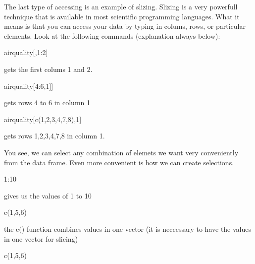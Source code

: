\documentclass[a4paper,twoside]{tufte-book}\usepackage[]{graphicx}\usepackage[]{color}
\begin{document}
\begin{Anhang}
The last type of accessing is an example of slizing. Slizing is a very powerfull technique that is available in most scientific programming languages. What it means is that you can access your data by typing in colums, rows, or particular elements. Look at the following commands (explanation always below):

\begin{Schunk}
\begin{Sinput}
airquality[,1:2]
\end{Sinput}
\end{Schunk}

gets the first colums 1 and 2.


\begin{Schunk}
\begin{Sinput}
airquality[4:6,1]]
\end{Sinput}
\end{Schunk}

gets rows 4 to 6 in column 1


\begin{Schunk}
\begin{Sinput}
airquality[c(1,2,3,4,7,8),1]
\end{Sinput}
\end{Schunk}

gets rows 1,2,3,4,7,8 in column 1. 

You see, we can select any combination of elemets we want very conveniently from the data frame. Even more convenient is how we can create selections.


\begin{Schunk}
\begin{Sinput}
1:10
\end{Sinput}
\end{Schunk}

gives us the values of 1 to 10

\begin{Schunk}
\begin{Sinput}
c(1,5,6)
\end{Sinput}
\end{Schunk}

the c() function combines values in one vector (it is neccessary to have the values in one vector for slicing)

\begin{Schunk}
\begin{Sinput}
c(1,5,6)
\end{Sinput}
\end{Schunk}


\end{Anhang}
\end{document}
